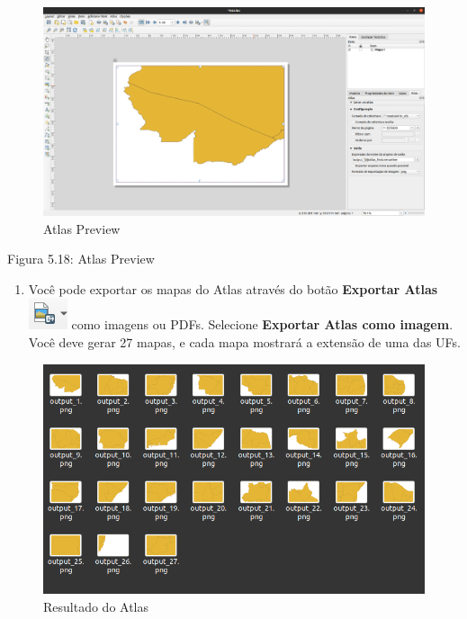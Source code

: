 \documentclass[
]{krantz}
\providecommand{\tightlist}{%
  \setlength{\itemsep}{0pt}\setlength{\parskip}{0pt}}
\begin{document}
\begin{figure}
\centering
\includegraphics{media/modulo5/atlas-preview.png}
\caption{Atlas Preview}
\end{figure}

Figura 5.18: Atlas Preview

\begin{enumerate}
\def\labelenumi{\arabic{enumi}.}
\setcounter{enumi}{5}
\tightlist
\item
  Você pode exportar os mapas do Atlas através do botão \textbf{Exportar Atlas} \includegraphics{media/modulo5/atlas-export-btn.png} como imagens ou PDFs. Selecione \textbf{Exportar Atlas como imagem}. Você deve gerar 27 mapas, e cada mapa mostrará a extensão de uma das UFs.
\end{enumerate}

\begin{figure}
\centering
\includegraphics{media/modulo5/atlas-outputs.png}
\caption{Resultado do Atlas}
\end{figure}
\end{document}
